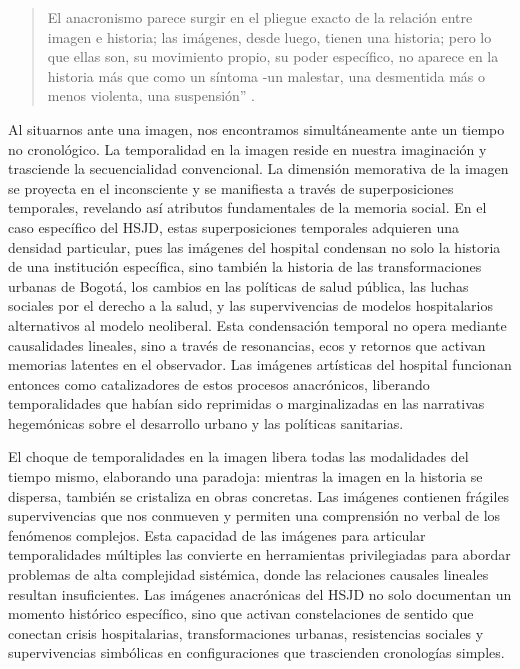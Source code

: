 \begin{quote}
    El anacronismo parece surgir en el pliegue exacto de la relación entre imagen e historia; las imágenes, desde luego, tienen una historia; pero lo que ellas son, su movimiento propio, su poder específico, no aparece en la historia más que como un síntoma -un malestar, una desmentida más o menos violenta, una suspensión'' \parencite[p. 48]{DidiHuberman2011}.
\end{quote}

Al situarnos ante una imagen, nos encontramos simultáneamente ante un tiempo no cronológico. La temporalidad en la imagen reside en nuestra imaginación y trasciende la secuencialidad convencional. La dimensión memorativa de la imagen se proyecta en el inconsciente y se manifiesta a través de superposiciones temporales, revelando así atributos fundamentales de la memoria social. En el caso específico del HSJD, estas superposiciones temporales adquieren una densidad particular, pues las imágenes del hospital condensan no solo la historia de una institución específica, sino también la historia de las transformaciones urbanas de Bogotá, los cambios en las políticas de salud pública, las luchas sociales por el derecho a la salud, y las supervivencias de modelos hospitalarios alternativos al modelo neoliberal. Esta condensación temporal no opera mediante causalidades lineales, sino a través de resonancias, ecos y retornos que activan memorias latentes en el observador. Las imágenes artísticas del hospital funcionan entonces como catalizadores de estos procesos anacrónicos, liberando temporalidades que habían sido reprimidas o marginalizadas en las narrativas hegemónicas sobre el desarrollo urbano y las políticas sanitarias.

El choque de temporalidades en la imagen libera todas las modalidades del tiempo mismo, elaborando una paradoja: mientras la imagen en la historia se dispersa, también se cristaliza en obras concretas. Las imágenes contienen frágiles supervivencias que nos conmueven y permiten una comprensión no verbal de los fenómenos complejos. Esta capacidad de las imágenes para articular temporalidades múltiples las convierte en herramientas privilegiadas para abordar problemas de alta complejidad sistémica, donde las relaciones causales lineales resultan insuficientes. Las imágenes anacrónicas del HSJD no solo documentan un momento histórico específico, sino que activan constelaciones de sentido que conectan crisis hospitalarias, transformaciones urbanas, resistencias sociales y supervivencias simbólicas en configuraciones que trascienden cronologías simples.

